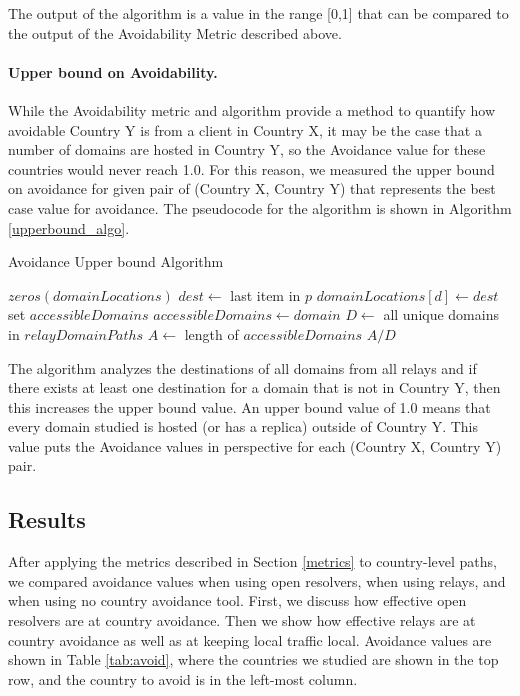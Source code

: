 The output of the algorithm is a value in the range [0,1] that can be compared to the output of the Avoidability Metric described above.  

\paragraph{Upper bound on Avoidability.}  While the Avoidability metric and algorithm provide a method to quantify how avoidable Country Y is from a client in Country X, it may be the case that a number of domains are hosted in Country Y, so the Avoidance value for these countries would never reach 1.0.  For this reason, we measured the upper bound on avoidance for given pair of (Country X, Country Y) that represents the best case value for avoidance.  The pseudocode for the algorithm is shown in Algorithm \ref{upperbound_algo}.

\begin{algorithm}[t]
\caption{Avoidance Upper bound Algorithm}
\label{upperbound_algo}
\begin{algorithmic}[1]
    \State $zeros(domainLocations)$
		\State $dest \gets $ last item in $p$
		\State $domainLocations[d] \gets dest$
    \EndFor
    \State set $accessibleDomains$
    \State $accessibleDomains \gets domain$
    \EndIf
    \EndFor
    \State $D \gets$ all unique domains in  $relayDomainPaths$
    \State $A \gets$ length of $accessibleDomains$
    \State \Return $A / D$
\EndFunction
\end{algorithmic}
\end{algorithm}

The algorithm analyzes the destinations of all domains from all relays and if there exists at least one destination for a domain that is not in Country Y, then this increases the upper bound value.  An upper bound value of 1.0 means that every domain studied is hosted (or has a replica) outside of Country Y.  This value puts the Avoidance values in perspective for each (Country X, Country Y) pair. 

\subsection{Results}
After applying the metrics described in Section \ref{metrics} to country-level paths, we compared avoidance values when using open resolvers, when using relays, and when using no country avoidance tool.  First, we discuss how effective open resolvers are at country avoidance.  Then we show how effective relays are at country avoidance as well as at keeping local traffic local.  Avoidance values are shown in Table \ref{tab:avoid}, where the countries we studied are shown in the top row, and the country to avoid is in the left-most column.  

